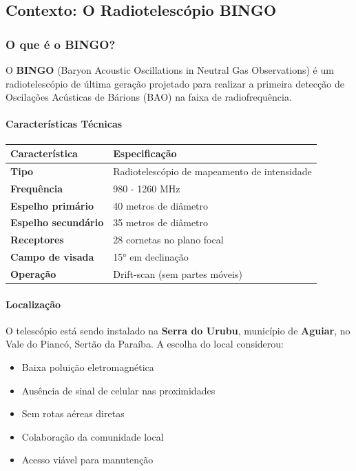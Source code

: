 \subsection{Contexto: O Radiotelescópio BINGO}

\subsubsection{O que é o BINGO?}

O \textbf{BINGO} (Baryon Acoustic Oscillations in Neutral Gas Observations) é um radiotelescópio de última geração projetado para realizar a primeira detecção de Oscilações Acústicas de Bárions (BAO) na faixa de radiofrequência.

\paragraph{Características Técnicas}

\bigskip\noindent
\begin{tabular}{p{}p{}}
\toprule
Característica & Especificação \\
\hline
\textbf{Tipo} & Radiotelescópio de mapeamento de intensidade \\
\textbf{Frequência} & 980 - 1260 MHz \\
\textbf{Espelho primário} & 40 metros de diâmetro \\
\textbf{Espelho secundário} & 35 metros de diâmetro \\
\textbf{Receptores} & 28 cornetas no plano focal \\
\textbf{Campo de visada} & 15° em declinação \\
\textbf{Operação} & Drift-scan (sem partes móveis) \\
\bottomrule
\end{tabular}

\bigskip

\paragraph{Localização}

O telescópio está sendo instalado na \textbf{Serra do Urubu}, município de \textbf{Aguiar}, no Vale do Piancó, Sertão da Paraíba. A escolha do local considerou:

\begin{itemize}
\item Baixa poluição eletromagnética
\item Ausência de sinal de celular nas proximidades
\item Sem rotas aéreas diretas
\item Colaboração da comunidade local
\item Acesso viável para manutenção
\end{itemize}

